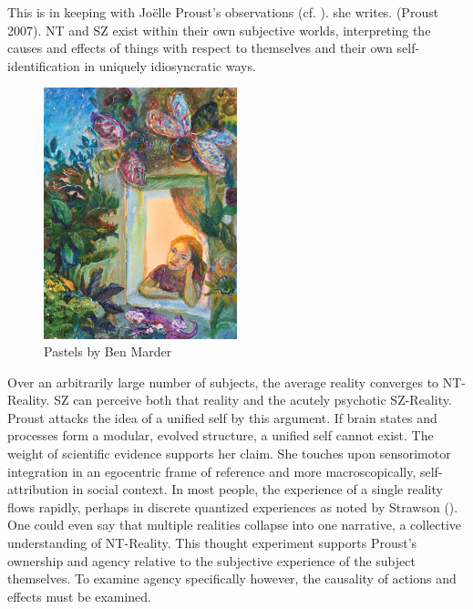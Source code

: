 \documentclass[]{article}
\begin{document}
		This is in keeping with Jo\"elle Proust's observations (cf. \cite{ProustAgencySchizophreniaControl2007}).  she writes.  (Proust 2007). NT and SZ exist within their own subjective worlds, interpreting the causes and effects of things with respect to themselves and their own self-identification in uniquely idiosyncratic ways.
		
		\begin{figure}
			\centering
			\includegraphics[width=0.5\textwidth]{graphics/BenMarder2}
			\caption{Pastels by Ben Marder}
		\end{figure}
		
		
		Over an arbitrarily large number of subjects, the average reality converges to NT-Reality. SZ can perceive both that reality and the acutely psychotic SZ-Reality. Proust attacks the idea of a unified self by this argument. If brain states and processes form a modular, evolved structure, a unified self cannot exist. The weight of scientific evidence supports her claim. She touches upon sensorimotor integration in an egocentric frame of reference and more macroscopically, self-attribution in social context. In most people, the experience of a single reality flows rapidly, perhaps in discrete quantized experiences as noted by Strawson (\cite{ZahaviExploringSelfPhilosophical2000}). One could even say that multiple realities collapse into one narrative, a collective understanding of NT-Reality. This thought experiment supports Proust’s ownership and agency relative to the subjective experience of the subject themselves. To examine agency specifically however, the causality of actions and effects must be examined.
\end{document}
